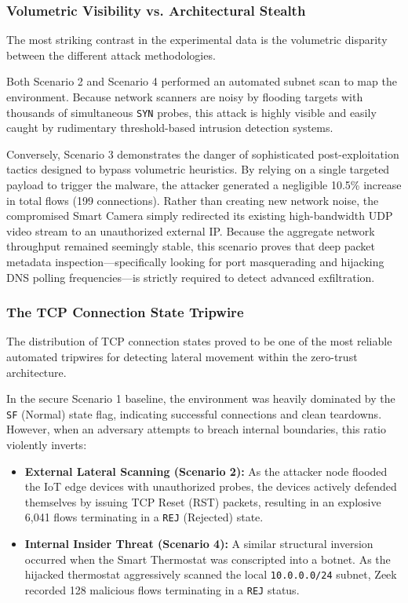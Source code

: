 \subsubsection{Volumetric Visibility vs. Architectural Stealth}

The most striking contrast in the experimental data is the volumetric disparity between the different attack methodologies. 

Both Scenario 2 and Scenario 4 performed an automated subnet scan to map the environment. Because network scanners are noisy by flooding targets with thousands of simultaneous \texttt{SYN} probes, this attack is highly visible and easily caught by rudimentary threshold-based intrusion detection systems.

Conversely, Scenario 3 demonstrates the danger of sophisticated post-exploitation tactics designed to bypass volumetric heuristics. By relying on a single targeted payload to trigger the malware, the attacker generated a negligible 10.5\% increase in total flows (199 connections). Rather than creating new network noise, the compromised Smart Camera simply redirected its existing high-bandwidth UDP video stream to an unauthorized external IP. Because the aggregate network throughput remained seemingly stable, this scenario proves that deep packet metadata inspection—specifically looking for port masquerading and hijacking DNS polling frequencies—is strictly required to detect advanced exfiltration.

\subsubsection{The TCP Connection State Tripwire}

The distribution of TCP connection states proved to be one of the most reliable automated tripwires for detecting lateral movement within the zero-trust architecture.

In the secure Scenario 1 baseline, the environment was heavily dominated by the \texttt{SF} (Normal) state flag, indicating successful connections and clean teardowns. However, when an adversary attempts to breach internal boundaries, this ratio violently inverts:

\begin{itemize}
	\item \textbf{External Lateral Scanning (Scenario 2):} As the attacker node flooded the IoT edge devices with unauthorized probes, the devices actively defended themselves by issuing TCP Reset (RST) packets, resulting in an explosive 6,041 flows terminating in a \texttt{REJ} (Rejected) state.
	\item \textbf{Internal Insider Threat (Scenario 4):} A similar structural inversion occurred when the Smart Thermostat was conscripted into a botnet. As the hijacked thermostat aggressively scanned the local \texttt{10.0.0.0/24} subnet, Zeek recorded 128 malicious flows terminating in a \texttt{REJ} status.
\end{itemize}

